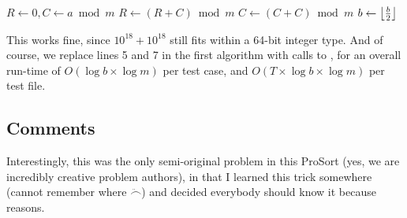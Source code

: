         \begin{algorithm}[H]
        \begin{algorithmic}[1]
            \State $R \gets 0, C \gets a \bmod m$
                    \State $R \gets \left(R + C\right) \bmod m$
                \EndIf
                \State $C \gets \left(C + C\right) \bmod m$
                \State $b \gets \floor*{\frac b2}$
            \EndWhile
        \EndFunction
        \end{algorithmic}
        \end{algorithm}

        This works fine, since $10^{18} + 10^{18}$ still fits within a 64-bit
        integer type.
        And of course, we replace lines 5 and 7 in the first algorithm with calls
        to , for an overall run-time of $O(\log b \times \log m)$
        per test case, and $O(T \times \log b \times \log m)$ per test file.

    \subsection{Comments}
        Interestingly, this was the only semi-original problem in this ProSort
        (yes, we are incredibly creative problem authors),
        in that I learned this trick somewhere (cannot remember where $\ddot\smallfrown$)
        and decided everybody should know it because reasons.